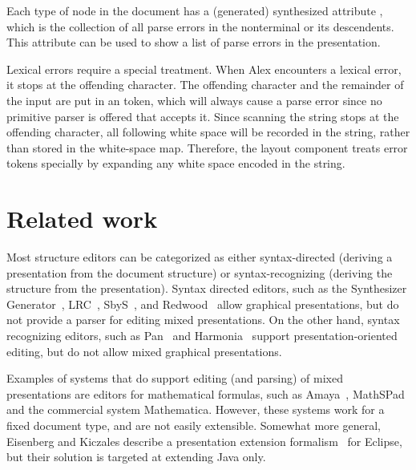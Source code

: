 \documentclass[12pt]{article}
\begin{document}
Each type of node in the document has a (generated) synthesized attribute , which is the collection of all parse errors in the nonterminal or its descendents. This attribute can be used to show a list of parse errors in the presentation. 


Lexical errors require a special treatment. When Alex encounters a lexical error, it stops at the offending character. The offending character and the remainder of the input are put in an  token, which will always cause a parse error since no primitive parser is offered that accepts it. Since scanning the string stops at the offending character, all following white space  will be recorded in the string, rather than stored in the white-space map. Therefore, the layout component treats error tokens specially by expanding any white space encoded in the string. %






%
\section{Related work}\label{sect:relatedWork}
%

Most structure editors can be categorized as either syntax-directed (deriving a presentation from the document structure) or syntax-recognizing (deriving the structure from the presentation). Syntax directed editors, such as the Synthesizer Generator~\cite{reps84synGen}, LRC~\cite{saraiva00lrc}, SbyS~\cite{magnusson90orm}, and Redwood~\cite{westphal04redwood} allow graphical presentations, but do not provide a parser for editing mixed presentations. On the other hand, syntax recognizing editors, such as Pan~\cite{ballance92pan} and Harmonia~\cite{boshernitsan01harmonia} support presentation-oriented editing, but do not allow mixed graphical presentations.

Examples of systems that do support editing (and parsing) of mixed presentations are editors for mathematical formulas, such as Amaya~\cite{amaya08}, MathSPad~\cite{verhoeven00mathspad} and the commercial system Mathematica. However, these systems work for a fixed document type, and are not easily extensible. Somewhat more general, Eisenberg and Kiczales describe a presentation extension formalism~\cite{eisenberg07presExtension} for Eclipse, but their solution is targeted at extending Java only.
\end{document}
